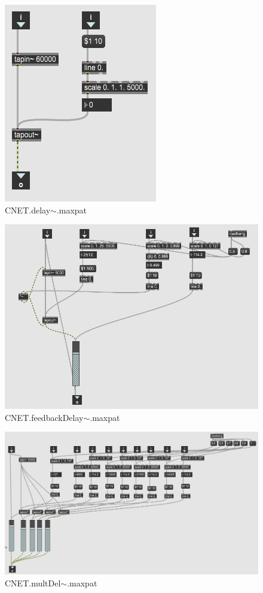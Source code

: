 \begin{figure}
    \centering
    \includegraphics{diagrams/maxPatches/CNET.delay~.png}
    \caption{CNET.delay$\sim$.maxpat}
    \label{fig:delMaxpat}
\end{figure}

\begin{figure}
    \centering
    \includegraphics{diagrams/maxPatches/CNET.feedbackDelay~.png}
    \caption{CNET.feedbackDelay$\sim$.maxpat}
    \label{fig:fbDelMaxpat}
\end{figure}

\begin{figure}
    \centering
    \includegraphics[scale=0.7]{diagrams/maxPatches/CNET.multDel~.png}
    \caption{CNET.multDel$\sim$.maxpat}
    \label{fig:multDel}
\end{figure}

